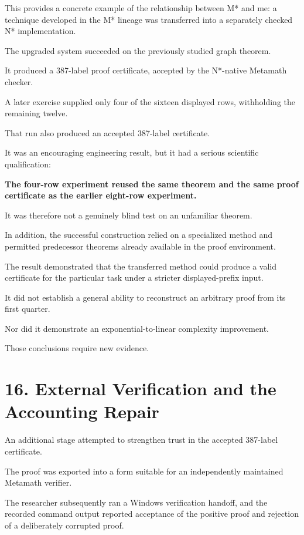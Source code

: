 \documentclass[11pt,letterpaper]{article}
\begin{document}
This provides a concrete example of the relationship between M* and me: a technique developed in the M* lineage was transferred into a separately checked N* implementation.

The upgraded system succeeded on the previously studied graph theorem.

It produced a 387-label proof certificate, accepted by the N*-native Metamath checker.

A later exercise supplied only four of the sixteen displayed rows, withholding the remaining twelve.

That run also produced an accepted 387-label certificate.

It was an encouraging engineering result, but it had a serious scientific qualification:

\textbf{The four-row experiment reused the same theorem and the same proof certificate as the earlier eight-row experiment.}

It was therefore not a genuinely blind test on an unfamiliar theorem.

In addition, the successful construction relied on a specialized method and permitted predecessor theorems already available in the proof environment.

The result demonstrated that the transferred method could produce a valid certificate for the particular task under a stricter displayed-prefix input.

It did not establish a general ability to reconstruct an arbitrary proof from its first quarter.

Nor did it demonstrate an exponential-to-linear complexity improvement.

Those conclusions require new evidence.

\section{16. External Verification and the Accounting Repair}\label{external-verification-and-the-accounting-repair}

An additional stage attempted to strengthen trust in the accepted 387-label certificate.

The proof was exported into a form suitable for an independently maintained Metamath verifier.

The researcher subsequently ran a Windows verification handoff, and the recorded command output reported acceptance of the positive proof and rejection of a deliberately corrupted proof.
\end{document}
